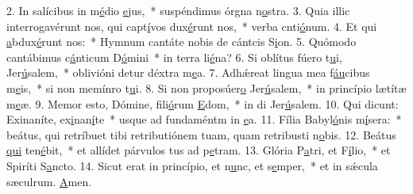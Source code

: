 2. In salícibus in m\uline{é}dio \uline{e}jus,~* suspéndimus órgna n\uline{o}stra.
3. Quia illic interrogavérunt nos, qui capt\uline{í}vos dux\uline{é}runt nos,~* verba cnti\uline{ó}num.
4. Et qui \uline{a}bdux\uline{é}runt nos:~* Hymnum cantáte nobis de cántcis S\uline{i}on.
5. Quómodo cantábimus c\uline{á}nticum D\uline{ó}mini~* in terra li\uline{é}na?
6. Si oblítus fúero t\uline{u}i, Jer\uline{ú}salem,~* oblivióni detur déxtra m\uline{e}a.
7. Adhǽreat lingua mea f\uline{áu}cibus m\uline{e}is,~* si non memínro t\uline{u}i.
8. Si non proposúer\uline{o} Jer\uline{ú}salem,~* in princípio lætítæ m\uline{e}æ.
9. Memor esto, Dómine, fili\uline{ó}rum \uline{E}dom,~* in di Jer\uline{ú}salem.
10. Qui dicunt: Exinaníte, ex\uline{i}nan\uline{í}te~* usque ad fundaméntm in \uline{e}a.
11. Fília Babyl\uline{ó}nis m\uline{í}sera:~* beátus, qui retríbuet tibi retributiónem tuam, quam retribusti n\uline{o}bis.
12. Beátus \uline{qui} ten\uline{é}bit,~* et allídet párvulos tus ad p\uline{e}tram.
13. Glória P\uline{a}tri, et F\uline{í}lio,~* et Spiríti S\uline{a}ncto.
14. Sicut erat in princípio, et n\uline{u}nc, et s\uline{e}mper,~* et in sǽcula sæculrum. \uline{A}men.
